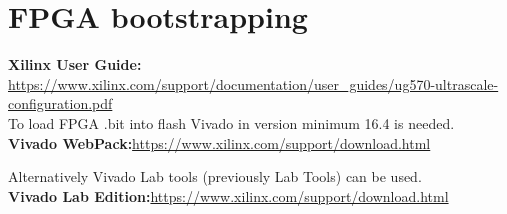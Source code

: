 \section{FPGA bootstrapping}


\noindent
\textbf{Xilinx User Guide:} \href{https://www.xilinx.com/support/documentation/user_guides/ug570-ultrascale-configuration.pdf}{https://www.xilinx.com/support/documentation/user\_guides/ug570-ultrascale-configuration.pdf}\\

To load FPGA .bit into flash Vivado in version minimum 16.4 is needed.\\
\textbf{Vivado WebPack:}\href{https://www.xilinx.com/support/download.html}{https://www.xilinx.com/support/download.html}

Alternatively Vivado Lab tools (previously Lab Tools) can be used.\\
\textbf{Vivado Lab Edition:}\href{https://www.xilinx.com/support/download.html}{https://www.xilinx.com/support/download.html}

